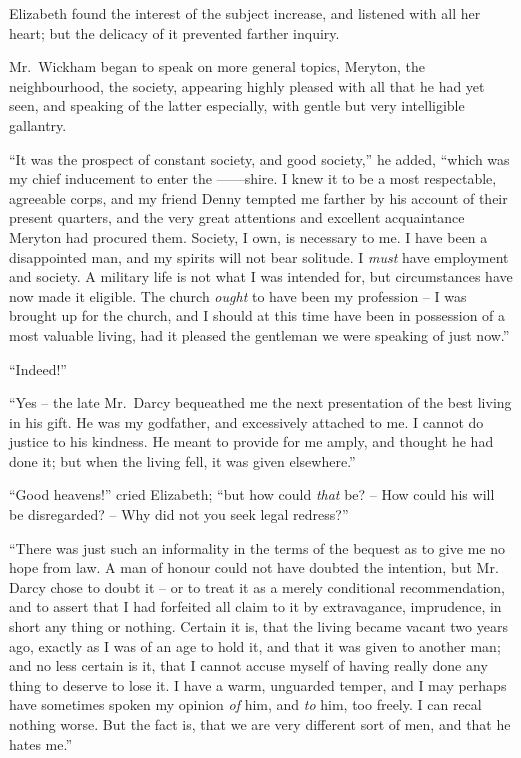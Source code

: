 Elizabeth found the interest of the subject increase, and
listened with all her heart; but the delicacy of it prevented
farther inquiry.

Mr.\ Wickham began to speak on more general topics,
Meryton, the neighbourhood, the society, appearing highly
pleased with all that he had yet seen, and speaking of the
latter especially, with gentle but very intelligible gallantry.

“It was the prospect of constant society, and good
society,” he added, “which was my chief inducement to
enter the \hbox{------shire}. I knew it to be a most respectable,
agreeable corps, and my friend Denny tempted me farther
by his account of their present quarters, and the very great
attentions and excellent acquaintance Meryton had procured
them. Society, I own, is necessary to me. I have
been a disappointed man, and my spirits will not bear
solitude. I \textit{must} have employment and society. A
military life is not what I was intended for, but circumstances
have now made it eligible. The church \textit{ought} to
have been my profession -- I was brought up for the church,
and I should at this time have been in possession of a most
valuable living, had it pleased the gentleman we were
speaking of just now.”

“Indeed!”

“Yes -- the late Mr.\ Darcy bequeathed me the next
presentation of the best living in his gift. He was my
godfather, and excessively attached to me. I cannot do
justice to his kindness. He meant to provide for me
amply, and thought he had done it; but when the living
fell, it was given elsewhere.”

“Good heavens!” cried Elizabeth; “but how could
\textit{that} be? -- How could his will be disregarded? -- Why did
not you seek legal redress?”

“There was just such an informality in the terms of
the bequest as to give me no hope from law. A man of
honour could not have doubted the intention, but Mr.\ %
Darcy chose to doubt it -- or to treat it as a merely conditional
recommendation, and to assert that I had forfeited
all claim to it by extravagance, imprudence, in short
any thing or nothing. Certain it is, that the living became
vacant two years ago, exactly as I was of an age to hold
it, and that it was given to another man; and no less
certain is it, that I cannot accuse myself of having really
done any thing to deserve to lose it. I have a warm,
unguarded temper, and I may perhaps have sometimes
spoken my opinion \textit{of} him, and \textit{to} him, too freely. I can
recal nothing worse. But the fact is, that we are very
different sort of men, and that he hates me.”

